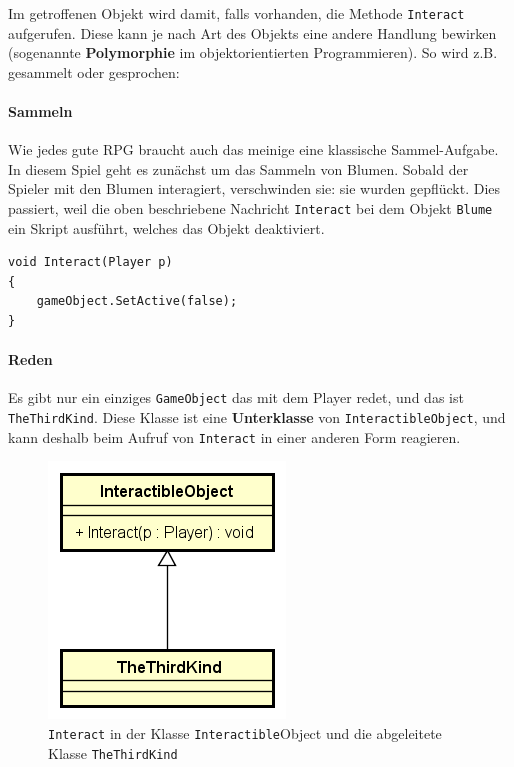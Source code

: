 Im getroffenen Objekt wird damit, falls vorhanden, die Methode \lstinline{Interact} aufgerufen. Diese kann je nach Art des Objekts eine andere Handlung bewirken (sogenannte \textbf{Polymorphie} im objektorientierten Programmieren). So wird z.B. gesammelt oder gesprochen:

\paragraph{Sammeln}
Wie jedes gute RPG braucht auch das meinige eine klassische Sammel-Aufgabe.
In diesem Spiel geht es zunächst um das Sammeln von Blumen. Sobald der Spieler mit den Blumen interagiert, verschwinden sie: sie wurden gepflückt.
Dies passiert, weil die oben beschriebene Nachricht \lstinline{Interact} bei dem Objekt \lstinline{Blume} ein Skript ausführt, welches das Objekt deaktiviert.
\begin{lstlisting}[caption={Standardimplementation von Interact}]
void Interact(Player p)
{
	gameObject.SetActive(false);
}
\end{lstlisting}
 
\paragraph{Reden}
Es gibt nur ein einziges \lstinline{GameObject} das mit dem Player redet, und das ist \lstinline{TheThirdKind}. Diese Klasse ist eine \textbf{Unterklasse} von \lstinline{InteractibleObject}, und kann deshalb beim Aufruf von \lstinline{Interact} in einer anderen Form reagieren.

\begin{figure}[H]
\includegraphics[scale=0.75]{diagramme/interactibleobject.png}
\caption{\lstinline{Interact} in der Klasse \lstinline{Interactible}Object und die abgeleitete Klasse \lstinline{TheThirdKind}}
\end{figure}

